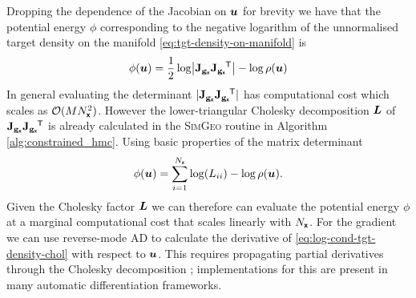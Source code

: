 Dropping the dependence of the Jacobian on $\boldsymbol{u}$ for brevity we have that the potential energy $\phi$ corresponding to the negative logarithm of the unnormalised target density on the manifold \eqref{eq:tgt-density-on-manifold} is
\begin{equation} \label{eq:log-cond-tgt-density}
    \phi(\vct{u}) =  
    \frac{1}{2} \log\left| 
      \jacobian{\genfunc_{\rvct{x}}}\jacobian{\genfunc_{\rvct{x}}}\phantom{}\tr
    \right| - \log\rho(\vct{u})
\end{equation}
In general evaluating the determinant $|\mathbf{J}_{{\mathbf{g}}_{\boldsymbol{\mathsf{x}}}}\mathbf{J}_{{\mathbf{g}}_{\boldsymbol{\mathsf{x}}}}\phantom{}^{\mkern-1.5mu\mathsf{T}}|$ has computational cost which scales as $\mathcal{O}(M N_{\boldsymbol{\mathsf{x}}}^2)$. However the lower-triangular Cholesky decomposition $\boldsymbol{L}$ of $\mathbf{J}_{{\mathbf{g}}_{\boldsymbol{\mathsf{x}}}}\mathbf{J}_{{\mathbf{g}}_{\boldsymbol{\mathsf{x}}}}\phantom{}^{\mkern-1.5mu\mathsf{T}}$ is already calculated in the \textsc{SimGeo} routine in Algorithm \ref{alg:constrained_hmc}. Using basic properties of the matrix determinant
\begin{equation}\label{eq:log-cond-tgt-density-chol}
    \phi(\boldsymbol{u}) = 
    \sum_{i=1}^{N_{\boldsymbol{\mathsf{x}}}}\log(L_{ii}) - \log\rho(\boldsymbol{u}).
\end{equation}
Given the Cholesky factor $\boldsymbol{L}$ we can therefore can evaluate the potential energy $\phi$ at a marginal computational cost that scales linearly with $N_{\boldsymbol{\mathsf{x}}}$. For the gradient we can use reverse-mode \ac{AD} to calculate the derivative of \eqref{eq:log-cond-tgt-density-chol} with respect to $\boldsymbol{u}$. This requires propagating partial derivatives through the Cholesky decomposition \citep{murray2016differentiation}; implementations for this are present in many automatic differentiation frameworks.

